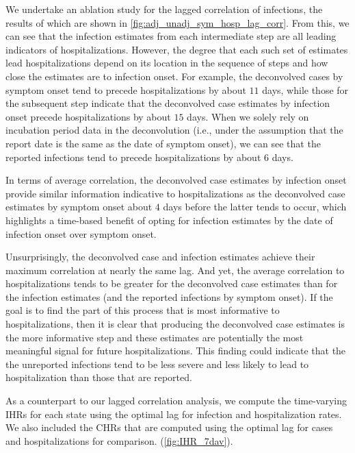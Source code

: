 \documentclass{article}
\begin{document}
We undertake an ablation study for the lagged correlation of infections, the results of which 
are shown in \autoref{fig:adj_unadj_sym_hosp_lag_corr}. From this, we can see that the 
infection estimates from each intermediate 
step are all leading indicators of hospitalizations. However, the degree that each such set of estimates
lead hospitalizations depend on its location in the sequence of steps and how close the estimates 
are to infection onset. For example, the deconvolved cases by symptom onset 
tend to precede hospitalizations by about $11$ days, 
while those for the subsequent step indicate that the deconvolved case estimates by infection onset
precede hospitalizations by about $15$ days. When we solely rely on incubation period data 
in the deconvolution (i.e., under the assumption that the report date is the same as the date 
of symptom onset), we can see that the reported infections tend to precede
hospitalizations by about $6$ days. 

In terms of average correlation, the deconvolved case estimates by infection onset provide similar
information indicative to hospitalizations as the deconvolved case estimates by symptom onset
about $4$ days before the latter tends to occur, which highlights a time-based benefit of opting for
infection estimates by the date of infection onset over symptom onset. 

Unsurprisingly, the deconvolved case and infection estimates achieve their maximum correlation
at nearly the same lag. And yet, the average correlation to hospitalizations
tends to be greater for the deconvolved case estimates than for the infection estimates (and
the reported infections by symptom onset). If the goal is to find the part of this process that is most informative to
 hospitalizations, then it is clear that producing the deconvolved case estimates is the more informative step
and these estimates are potentially the most meaningful signal for future hospitalizations.
 This finding could indicate that the the unreported infections tend to be less severe and 
 less likely to lead to hospitalization than those that are reported.

As a counterpart to our lagged correlation analysis, we compute the time-varying IHRs 
for each state using the optimal lag for infection and hospitalization rates. We also included
the CHRs that are computed using the optimal lag for cases and hospitalizations for comparison.
(\autoref{fig:IHR_7dav}). 
\end{document}
